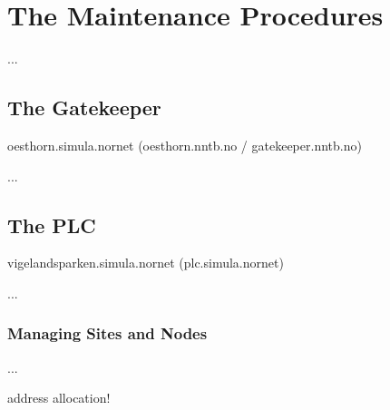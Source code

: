 
\chapter{The  Maintenance Procedures}
\label{cha:Maintenance}

...


\section{The Gatekeeper}
\label{sec:The-Gatekeeper}

oesthorn.simula.nornet (oesthorn.nntb.no / gatekeeper.nntb.no)

...



\section{The PLC}

vigelandsparken.simula.nornet (plc.simula.nornet)

...

\subsection{Managing Sites and Nodes}

...

address allocation!

